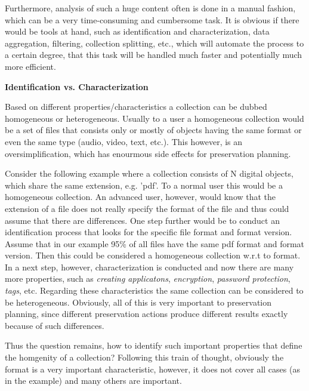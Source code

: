 Furthermore, analysis of such a huge content often is done in a manual fashion, which can be a very time-consuming and cumbersome task. It is obvious if there would be tools at hand, such as identification and characterization, data aggregation, filtering, collection splitting, etc., which will automate the process to a certain degree, that this task will be handled much faster and potentially much more efficient. \newline

\textbf{Identification vs. Characterization}

Based on different properties/characteristics a collection can be dubbed homogeneous or heterogeneous. Usually to a user a homogeneous collection would be a set of files that consists only or mostly of objects having the same format or even the same type (audio, video, text, etc.). This however, is an oversimplification, which has enourmous side effects for preservation planning.

Consider the following example where a collection consists of N digital objects, which share the same extension, e.g. 'pdf'. To a normal user this would be a homogeneous collection. An advanced user, however, would know that the extension of a file does not really specify the format of the file and thus could assume that there are differences.
One step further would be to conduct an identification process that looks for the specific file format and format version. Assume that in our example 95\% of all files have the same pdf format and format version.  Then this could be considered a homogeneous collection w.r.t to format. 
In a next step, however, characterization is conducted and now there are many more properties, such as \textit{creating applicatons}, \textit{encryption}, \textit{password protection}, \textit{tags}, etc.
Regarding these characteristics the same collection can be considered to be heterogeneous.
Obviously, all of this is very important to preservation planning, since different preservation actions produce different results exactly because of such differences.

Thus the question remains, how to identify such important properties that define the homgenity of a collection? Following this train of thought, obviously the format is a very important characteristic, however, it does not cover all cases (as in the example) and many others are important. \newline


